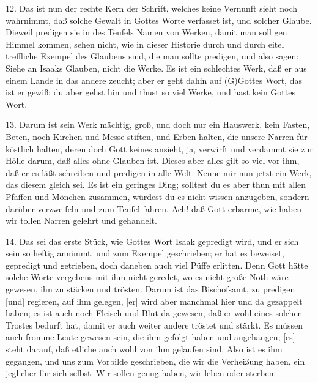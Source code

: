 12. Das ist nun der rechte Kern der Schrift, welches keine Vernunft sieht noch wahrnimmt, daß solche Gewalt in Gottes Worte verfasset ist, und solcher Glaube. Dieweil predigen sie in des Teufels Namen von Werken, damit man soll gen Himmel kommen, sehen nicht, wie in dieser Historie durch und durch eitel treffliche Exempel des Glaubens sind, die man sollte predigen, und also sagen: Siehe an Isaaks Glauben, nicht die Werke. Es ist ein schlechtes Werk, daß er aus einem Lande in das andere zeucht; aber er geht dahin auf (G)Gottes Wort, das ist er gewiß; du aber gehst hin und thust so viel Werke, und hast kein Gottes Wort.

13. Darum ist sein Werk mächtig, groß, und doch nur ein Hauswerk, kein Fasten, Beten, noch Kirchen und Messe stiften, und Erben halten, die unsere Narren für köstlich halten, deren doch Gott keines ansieht, ja, verwirft und verdammt sie zur Hölle darum, daß alles ohne Glauben ist. Dieses aber alles gilt so viel vor ihm, daß er es läßt schreiben und predigen in alle Welt. Nenne mir nun jetzt ein Werk, das diesem gleich sei. Es ist ein geringes Ding; solltest du es aber thun mit allen Pfaffen und Mönchen zusammen, würdest du es nicht wissen anzugeben, sondern darüber verzweifeln und zum Teufel fahren. Ach! daß Gott erbarme, wie haben wir tollen Narren gelehrt und gehandelt.

14. Das sei das erste Stück, wie Gottes Wort Isaak gepredigt wird, und er sich sein so heftig annimmt, und zum Exempel geschrieben; er hat es beweiset, gepredigt und getrieben, doch daneben auch viel Püffe erlitten. Denn Gott hätte solche Worte vergebens mit ihm nicht geredet, wo es nicht große Noth wäre gewesen, ihn zu stärken und trösten. Darum ist das Bischofsamt, zu predigen [und] regieren, auf ihm gelegen, [er] wird aber manchmal hier und da gezappelt haben; es ist auch noch Fleisch und Blut da gewesen, daß er wohl eines solchen Trostes bedurft hat, damit er auch weiter andere tröstet und stärkt. Es müssen auch fromme Leute gewesen sein, die ihm gefolgt haben und angehangen; [es] steht darauf, daß etliche auch wohl von ihm gelaufen sind. Also ist es ihm gegangen, und uns zum Vorbilde geschrieben, die wir die Verheißung haben, ein jeglicher für sich selbst. Wir sollen genug haben, wir leben oder sterben.

